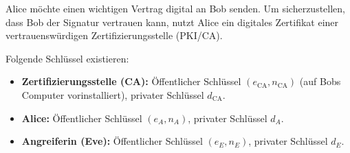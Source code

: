 \begin{myexercise}
	Alice möchte einen wichtigen Vertrag digital an Bob senden. Um sicherzustellen, dass Bob der Signatur vertrauen kann, nutzt Alice ein digitales Zertifikat einer vertrauenswürdigen Zertifizierungsstelle (\gls{PKI}/\gls{CA}).

	Folgende Schlüssel existieren:
	\begin{itemize}
		\item \textbf{Zertifizierungsstelle (\gls{CA}):} Öffentlicher Schlüssel $(e_{\text{CA}}, n_{\text{CA}})$ (auf Bobs Computer vorinstalliert), privater Schlüssel $d_{\text{CA}}$.
		\item \textbf{Alice:} Öffentlicher Schlüssel $(e_A, n_A)$, privater Schlüssel $d_A$.
		\item \textbf{Angreiferin (Eve):} Öffentlicher Schlüssel $(e_E, n_E)$, privater Schlüssel $d_E$.
	\end{itemize}


\end{myexercise}
